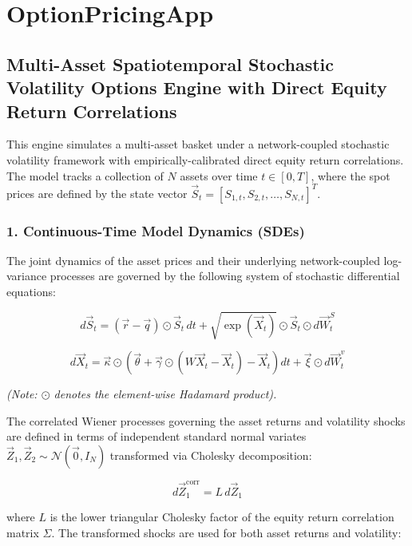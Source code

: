 \documentclass[
]{article}
\author{}
\date{}
\begin{document}
\section{OptionPricingApp}\label{optionpricingapp}

\subsection{Multi-Asset Spatiotemporal Stochastic Volatility Options
Engine with Direct Equity Return
Correlations}\label{multi-asset-spatiotemporal-stochastic-volatility-options-engine-with-direct-equity-return-correlations}

This engine simulates a multi-asset basket under a network-coupled
stochastic volatility framework with empirically-calibrated direct
equity return correlations. The model tracks a collection of \(N\)
assets over time \(t \in [0, T]\), where the spot prices are defined by
the state vector \(\vec{S}_t = [S_{1,t}, S_{2,t}, \dots, S_{N,t}]^T\).

\subsubsection{1. Continuous-Time Model Dynamics
(SDEs)}\label{continuous-time-model-dynamics-sdes}

The joint dynamics of the asset prices and their underlying
network-coupled log-variance processes are governed by the following
system of stochastic differential equations:

\[d\vec{S}_t = (\vec{r} - \vec{q}) \odot \vec{S}_t \, dt + \sqrt{\exp(\vec{X}_t)} \odot \vec{S}_t \odot d\vec{W}_t^S\]

\[d\vec{X}_t = \vec{\kappa} \odot \left( \vec{\theta} + \vec{\gamma} \odot (W\vec{X}_t - \vec{X}_t) - \vec{X}_t \right) dt + \vec{\xi} \odot d\vec{W}_t^v\]

\emph{(Note: \(\odot\) denotes the element-wise Hadamard product).}

The correlated Wiener processes governing the asset returns and
volatility shocks are defined in terms of independent standard normal
variates \(\vec{Z}_1, \vec{Z}_2 \sim \mathcal{N}(\vec{0}, I_N)\)
transformed via Cholesky decomposition:

\[d\vec{Z}_1^{\text{corr}} = L \, d\vec{Z}_1\]

where \(L\) is the lower triangular Cholesky factor of the equity return
correlation matrix \(\Sigma\). The transformed shocks are used for both
asset returns and volatility:
\end{document}
